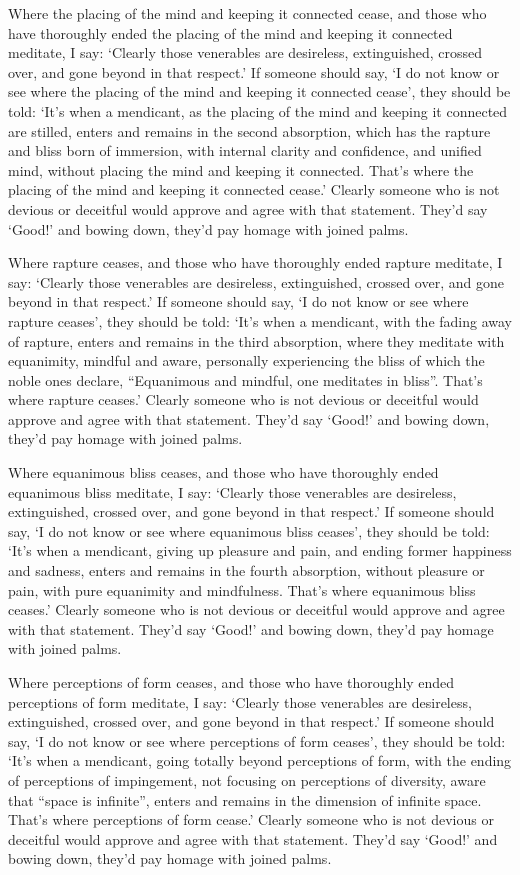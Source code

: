 \documentclass[12pt,openany]{book}%
\begin{document}
Where the placing of the mind and keeping it connected cease, and those who have thoroughly ended the placing of the mind and keeping it connected meditate, I say: ‘Clearly those venerables are desireless, extinguished, crossed over, and gone beyond in that respect.’ If someone should say, ‘I do not know or see where the placing of the mind and keeping it connected cease’, they should be told: ‘It’s when a mendicant, as the placing of the mind and keeping it connected are stilled, enters and remains in the second absorption, which has the rapture and bliss born of immersion, with internal clarity and confidence, and unified mind, without placing the mind and keeping it connected. That’s where the placing of the mind and keeping it connected cease.’ Clearly someone who is not devious or deceitful would approve and agree with that statement. They’d say ‘Good!’ and bowing down, they’d pay homage with joined palms. 

Where rapture ceases, and those who have thoroughly ended rapture meditate, I say: ‘Clearly those venerables are desireless, extinguished, crossed over, and gone beyond in that respect.’ If someone should say, ‘I do not know or see where rapture ceases’, they should be told: ‘It’s when a mendicant, with the fading away of rapture, enters and remains in the third absorption, where they meditate with equanimity, mindful and aware, personally experiencing the bliss of which the noble ones declare, “Equanimous and mindful, one meditates in bliss”. That’s where rapture ceases.’ Clearly someone who is not devious or deceitful would approve and agree with that statement. They’d say ‘Good!’ and bowing down, they’d pay homage with joined palms. 

Where equanimous bliss ceases, and those who have thoroughly ended equanimous bliss meditate, I say: ‘Clearly those venerables are desireless, extinguished, crossed over, and gone beyond in that respect.’ If someone should say, ‘I do not know or see where equanimous bliss ceases’, they should be told: ‘It’s when a mendicant, giving up pleasure and pain, and ending former happiness and sadness, enters and remains in the fourth absorption, without pleasure or pain, with pure equanimity and mindfulness. That’s where equanimous bliss ceases.’ Clearly someone who is not devious or deceitful would approve and agree with that statement. They’d say ‘Good!’ and bowing down, they’d pay homage with joined palms. 

Where perceptions of form ceases, and those who have thoroughly ended perceptions of form meditate, I say: ‘Clearly those venerables are desireless, extinguished, crossed over, and gone beyond in that respect.’ If someone should say, ‘I do not know or see where perceptions of form ceases’, they should be told: ‘It’s when a mendicant, going totally beyond perceptions of form, with the ending of perceptions of impingement, not focusing on perceptions of diversity, aware that “space is infinite”, enters and remains in the dimension of infinite space. That’s where perceptions of form cease.’ Clearly someone who is not devious or deceitful would approve and agree with that statement. They’d say ‘Good!’ and bowing down, they’d pay homage with joined palms. 
\end{document}
